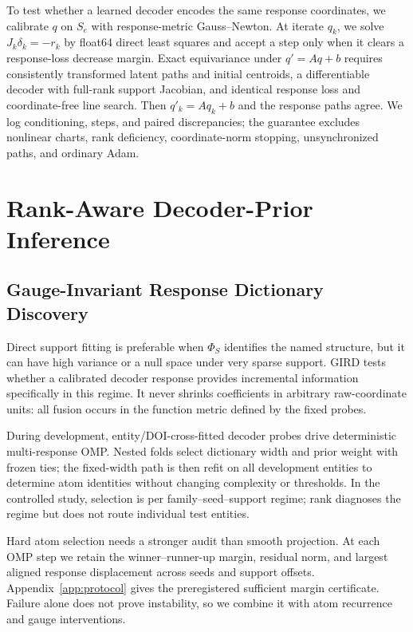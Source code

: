 To test whether a learned decoder encodes the same response coordinates, we
calibrate $q$ on $S_e$ with response-metric Gauss--Newton.  At iterate $q_k$,
we solve $J_k\delta_k=-r_k$ by float64 direct least squares and accept a step
only when it clears a response-loss decrease margin.  Exact equivariance under
$q'=Aq+b$ requires consistently transformed latent paths and initial centroids,
a differentiable decoder with full-rank support Jacobian, and identical
response loss and coordinate-free line search.  Then $q'_k=Aq_k+b$ and the
response paths agree.  We log conditioning, steps, and paired discrepancies;
the guarantee excludes nonlinear charts, rank deficiency, coordinate-norm
stopping, unsynchronized paths, and ordinary Adam.

\section{Rank-Aware Decoder-Prior Inference}
\label{sec:gird}

\subsection{Gauge-Invariant Response Dictionary Discovery}

Direct support fitting is preferable when $\Phi_S$ identifies the named
structure, but it can have high variance or a null space under very sparse
support.  GIRD tests whether a calibrated decoder response provides incremental
information specifically in this regime.  It never shrinks coefficients in
arbitrary raw-coordinate units: all fusion occurs in the function metric
defined by the fixed probes.

During development, entity/DOI-cross-fitted decoder probes drive deterministic
multi-response OMP.  Nested folds select dictionary width and prior weight with
frozen ties; the fixed-width path is then refit on all development entities to
determine atom identities without changing complexity or thresholds.  In the
controlled study, selection is per family--seed--support regime; rank diagnoses
the regime but does not route individual test entities.

Hard atom selection needs a stronger audit than smooth projection.  At each OMP
step we retain the winner--runner-up margin, residual norm, and largest aligned
response displacement across seeds and support offsets.  Appendix~\ref{app:protocol}
gives the preregistered sufficient margin certificate.  Failure alone does not
prove instability, so we combine it with atom recurrence and gauge interventions.


